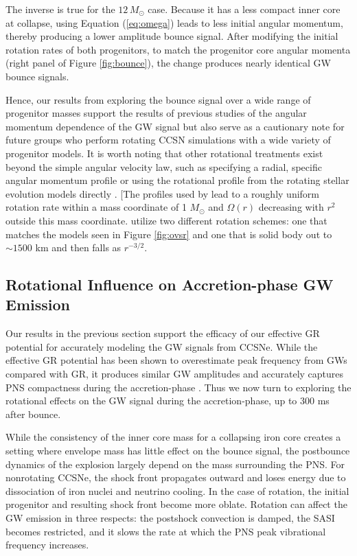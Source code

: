 \documentclass[twocolumn,times]{aastex62}  %
\begin{document}
The inverse is true for the $12\,M_\odot$ case.  Because it has a less compact inner core at collapse, using Equation (\ref{eq:omega}) leads to less initial angular momentum, thereby producing a lower amplitude bounce signal.  After modifying the initial rotation rates of both progenitors, to match the progenitor core angular momenta (right panel of Figure \ref{fig:bounce}), the change produces nearly identical GW bounce signals.  

Hence, our results from exploring the bounce signal over a wide range of progenitor masses support the results of previous studies of the angular momentum dependence of the GW signal \citep{dimm:2008,abdik:2010,abdik:2014} but also serve as a cautionary note for future groups who perform rotating CCSN simulations with a wide variety of progenitor models.  
It is worth noting that other rotational treatments exist beyond the simple angular velocity law, such as specifying a radial, specific angular momentum profile \citep[eg.,][]{oconnor:2011} or using the rotational profile from the rotating stellar evolution models directly \citep{summa:2018}.  [The profiles used by \citet{oconnor:2011} lead to a roughly uniform rotation rate within a mass coordinate of 1 $M_\odot$ and $\Omega(r)$ decreasing with  $r^{2}$ outside this mass coordinate.  \citet{summa:2018} utilize two different rotation schemes: one that matches the \citet{heger:2005} models seen in Figure \ref{fig:ovsr} and one that is solid body out to $\sim 1500$ km and then falls as $r^{-3/2}$.

\subsection{Rotational Influence on Accretion-phase GW Emission}

Our results in the previous section support the efficacy of our effective GR potential for accurately modeling the GW signals from CCSNe.  While the effective GR potential has been shown to overestimate peak frequency from GWs compared with GR, it produces similar GW amplitudes and accurately captures PNS compactness during the accretion-phase \citep{muller:2013}.  Thus we now turn to exploring the rotational effects on the GW signal during the accretion-phase, up to 300 ms after bounce.

While the consistency of the inner core mass for a collapsing iron core creates a setting where envelope mass has little effect on the bounce signal, the postbounce dynamics of the explosion largely depend on the mass surrounding the PNS.  For nonrotating CCSNe, the shock front propagates outward and loses energy due to dissociation of iron nuclei and neutrino cooling.  In the case of rotation, the initial progenitor and resulting shock front become more oblate.  Rotation can affect the GW emission in three respects: the postshock convection is damped, the SASI becomes restricted, and it slows the rate at which the PNS peak vibrational frequency increases.
\end{document}
